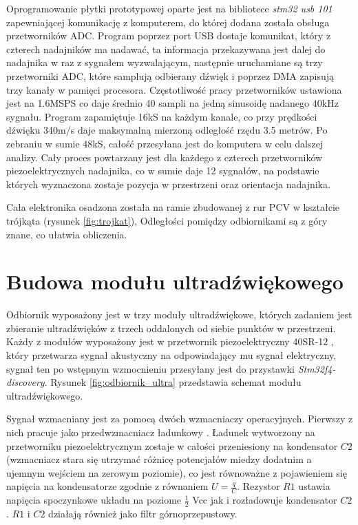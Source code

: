Oprogramowanie płytki prototypowej oparte jest na bibliotece \textit{stm32 usb 101} \cite{bib:stm32_usb_101}
zapewniającej komunikację z komputerem, do której dodana została obsługa przetworników ADC.
Program poprzez port USB dostaje komunikat, który z czterech nadajników ma nadawać, ta informacja przekazywana jest
dalej do nadajnika w raz z sygnałem wyzwalającym, następnie uruchamiane są trzy przetworniki ADC, które 
samplują odbierany dźwięk i poprzez DMA zapisują trzy kanały w pamięci procesora.
Częstotliwość pracy przetworników ustawiona jest na 1.6MSPS co daje średnio 40 sampli na jedną sinusoidę nadanego 40kHz sygnału.
Program zapamiętuje 16kS na każdym kanale, co przy prędkości dźwięku 340m/s daje maksymalną mierzoną odległość rzędu 3.5 metrów.
Po zebraniu w sumie 48kS, całość przesyłana jest do komputera w celu dalszej analizy.
Cały proces powtarzany jest dla każdego z czterech przetworników piezoelektrycznych nadajnika, 
co w sumie daje 12 sygnałów, na podstawie których wyznaczona zostaje 
pozycja w przestrzeni oraz orientacja nadajnika.

Cała elektronika osadzona została na ramie zbudowanej z rur PCV w kształcie trójkąta (rysunek \ref{fig:trojkat}), 
Odległości pomiędzy odbiornikami są z góry znane, co ułatwia obliczenia.




\clearpage
\section{Budowa modułu ultradźwiękowego}

Odbiornik wyposażony jest w trzy moduły ultradźwiękowe, których zadaniem jest 
zbieranie ultradźwięków z trzech oddalonych od siebie punktów w
przestrzeni.
Każdy z modułów wyposażony jest w przetwornik piezoelektryczny 40SR-12 \cite{bib:40ST12},
który przetwarza sygnał akustyczny na odpowiadający mu sygnał elektryczny, sygnał ten po wstępnym wzmocnieniu
przesyłany jest do przystawki \textit{Stm32f4-discovery}.
Rysunek \ref{fig:odbiornik_ultra} przedstawia schemat modułu ultradźwiękowego.


Sygnał wzmacniany jest za pomocą dwóch wzmacniaczy operacyjnych.
Pierwszy z nich pracuje jako przedwzmacniacz ładunkowy \cite{bib:wzm_ladunkowy}.
Ładunek wytworzony na przetworniku piezoelektrycznym zostaje w całości przeniesiony na kondensator $C2$ 
(wzmacniacz stara się utrzymać różnicę potencjałów miedzy dodatnim a ujemnym wejściem na zerowym poziomie),
co jest równoważne z pojawieniem się napięcia na kondensatorze zgodnie z równaniem $U=\frac{q}{C}$.
Rezystor $R1$ ustawia napięcia spoczynkowe układu na poziome $\frac{1}{2}$ Vcc jak i rozładowuje kondensator $C2$.
$R1$ i $C2$ działają również jako filtr górnoprzepustowy.

